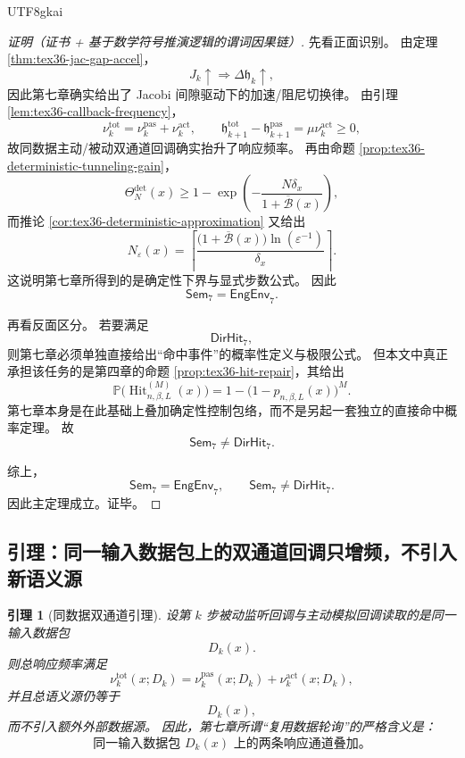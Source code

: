 \documentclass[12pt]{article}
\newtheorem{lemma}{引理}[section]
\begin{document}
\begin{CJK*}{UTF8}{gkai}
\begin{proof}[证明（证书 + 基于数学符号推演逻辑的谓词因果链）]
先看正面识别。
由定理 \ref{thm:tex36-jac-gap-accel}，
\[
  J_k\uparrow
  \Longrightarrow
  \Delta\mathfrak h_k\uparrow,
\]
因此第七章确实给出了 Jacobi 间隙驱动下的加速/阻尼切换律。
由引理 \ref{lem:tex36-callback-frequency}，
\[
  \nu_k^{\mathrm{tot}}
  =
  \nu_k^{\mathrm{pas}}+\nu_k^{\mathrm{act}},
\qquad
  \mathfrak h_{k+1}^{\mathrm{tot}}-\mathfrak h_{k+1}^{\mathrm{pas}}
  =
  \mu\nu_k^{\mathrm{act}}\ge 0,
\]
故同数据主动/被动双通道回调确实抬升了响应频率。
再由命题 \ref{prop:tex36-deterministic-tunneling-gain}，
\[
  \Theta_N^{\mathrm{det}}(x)
  \ge
  1-\exp\left(
    -\frac{N\delta_x}{1+\overline{\mathcal B}(x)}
  \right),
\]
而推论 \ref{cor:tex36-deterministic-approximation} 又给出
\[
  N_\varepsilon(x)
  =
  \left\lceil
    \frac{
      \bigl(1+\overline{\mathcal B}(x)\bigr)\ln(\varepsilon^{-1})
    }{\delta_x}
  \right\rceil.
\]
这说明第七章所得到的是确定性下界与显式步数公式。
因此
\[
  \mathsf{Sem}_7=\mathsf{EngEnv}_7.
\]

再看反面区分。
若要满足
\[
  \mathsf{DirHit}_7,
\]
则第七章必须单独直接给出“命中事件”的概率性定义与极限公式。
但本文中真正承担该任务的是第四章的命题 \ref{prop:tex36-hit-repair}，其给出
\[
  \mathbb P\bigl(\operatorname{Hit}_{n,\beta,L}^{(M)}(x)\bigr)
  =
  1-\bigl(1-p_{n,\beta,L}(x)\bigr)^M.
\]
第七章本身是在此基础上叠加确定性控制包络，而不是另起一套独立的直接命中概率定理。
故
\[
  \mathsf{Sem}_7\neq \mathsf{DirHit}_7.
\]

综上，
\[
  \mathsf{Sem}_7=\mathsf{EngEnv}_7,
  \qquad
  \mathsf{Sem}_7\neq \mathsf{DirHit}_7.
\]
因此主定理成立。证毕。
\end{proof}

\subsection{引理：同一输入数据包上的双通道回调只增频，不引入新语义源}
\label{subsec:tex36-ch8-lemma}

\begin{lemma}[同数据双通道引理]
\label{lem:tex36-ch8-same-data}
设第 $k$ 步被动监听回调与主动模拟回调读取的是同一输入数据包
\[
  D_k(x).
\]
则总响应频率满足
\[
  \nu_k^{\mathrm{tot}}(x;D_k)
  =
  \nu_k^{\mathrm{pas}}(x;D_k)
  +
  \nu_k^{\mathrm{act}}(x;D_k),
\]
并且总语义源仍等于
\[
  D_k(x),
\]
而不引入额外外部数据源。
因此，第七章所谓“复用数据轮询”的严格含义是：
\[
  \text{同一输入数据包 }D_k(x)\text{ 上的两条响应通道叠加。}
\]
\end{lemma}


\end{CJK*}
\end{document}
